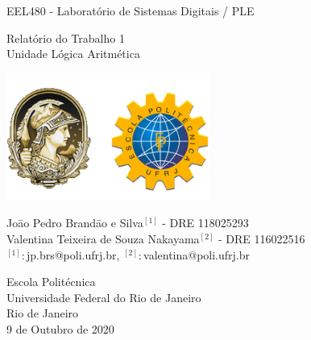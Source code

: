 \begin{titlepage}
   \begin{center}
        \vspace{1cm}   
        \LARGE{EEL480 - Laboratório de Sistemas Digitais / PLE}
       

        \vspace{0.5cm}
        \Large{Relatório do Trabalho 1 \\ Unidade Lógica Aritmética}
            
        \vspace{2.5cm}
     
        \begin{center}
           \includegraphics[width=0.5\textwidth]{img/logos.png}
        \end{center}
       
        \vspace{2.5cm}
       
        \large{Joāo Pedro Brandāo e Silva$^{[1]}$ - DRE 118025293 \\ Valentina    Teixeira de Souza Nakayama$^{[2]}$ - DRE 116022516 \\
        $^{[1]}: $jp.brs@poli.ufrj.br, $^{[2]}: $valentina@poli.ufrj.br}
       
        \vfill
        Escola Politécnica\\
        Universidade Federal do Rio de Janeiro\\
        Rio de Janeiro\\
        9 de Outubro de 2020
            
   \end{center}
\end{titlepage}